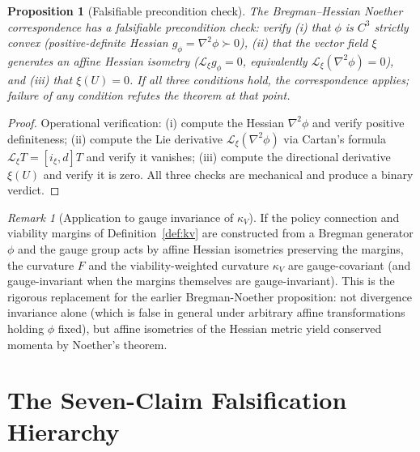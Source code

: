 \documentclass[11pt,a4paper]{article}
\theoremstyle{plain}
\newtheorem{proposition}[theorem]{Proposition}
\theoremstyle{definition}
\theoremstyle{remark}
\newtheorem{remark}[theorem]{Remark}
\newcommand{\kk}{\kappa_{\!V}}
\begin{document}
\begin{proposition}[Falsifiable precondition check]
\label{prop:noether-precondition}
The Bregman--Hessian Noether correspondence has a falsifiable
precondition check: verify (i) that $\phi$ is $C^3$ strictly convex
(positive-definite Hessian $g_\phi = \nabla^2 \phi \succ 0$), (ii)
that the vector field $\xi$ generates an affine Hessian isometry
($\mathcal L_\xi g_\phi = 0$, equivalently $\mathcal L_\xi
(\nabla^2 \phi) = 0$), and (iii) that $\xi(U) = 0$. If all three
conditions hold, the correspondence applies; failure of any condition
refutes the theorem at that point.
\end{proposition}

\begin{proof}
Operational verification: (i) compute the Hessian $\nabla^2 \phi$ and
verify positive definiteness; (ii) compute the Lie derivative
$\mathcal L_\xi (\nabla^2 \phi)$ via Cartan's formula
$\mathcal L_\xi T = [i_\xi, d] T$ and verify it vanishes; (iii) compute
the directional derivative $\xi(U)$ and verify it is zero. All three
checks are mechanical and produce a binary verdict.
\end{proof}

\begin{remark}[Application to gauge invariance of $\kk$]
If the policy connection and viability margins of
Definition~\ref{def:kv} are constructed from a Bregman
generator $\phi$ and the gauge group acts by affine Hessian isometries
preserving the margins, the curvature $F$ and the viability-weighted
curvature $\kk$ are gauge-covariant (and gauge-invariant when the
margins themselves are gauge-invariant). This is the rigorous
replacement for the earlier Bregman-Noether proposition: not divergence
invariance alone (which is false in general under arbitrary affine
transformations holding $\phi$ fixed), but affine isometries of the
Hessian metric yield conserved momenta by Noether's theorem.
\end{remark}


\section{The Seven-Claim Falsification Hierarchy}\label{sec:hierarchy}
\end{document}
